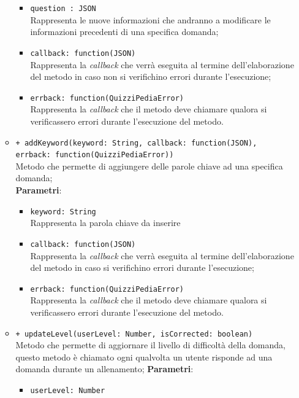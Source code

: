 \begin{itemize}
\begin{itemize}
		\begin{itemize}
			\item \texttt{question : JSON} \\
			Rappresenta le nuove informazioni che andranno a modificare le informazioni precedenti di una specifica domanda;
			\item \texttt{callback: function(JSON)} \\
			Rappresenta la \textit{callback} che verrà eseguita al termine dell'elaborazione del metodo in caso non si verifichino errori durante l'esecuzione;
			\item \texttt{errback: function(QuizziPediaError)} \\
			Rappresenta la \textit{callback} che il metodo deve chiamare qualora si verificassero errori durante l'esecuzione del metodo.
		\end{itemize}
	\item \texttt{+ addKeyword(keyword: String, callback: function(JSON),\\ errback: function(QuizziPediaError))} \\
	Metodo che permette di aggiungere delle parole chiave ad una specifica domanda; \\
		\textbf{Parametri}:
			 \begin{itemize}
			 	\item \texttt{keyword: String} \\
			 	Rappresenta la parola chiave da inserire
			 	\item \texttt{callback: function(JSON)} \\
			 	Rappresenta la \textit{callback} che verrà eseguita al termine dell'elaborazione del metodo in caso si verifichino errori durante l'esecuzione;
			 	\item \texttt{errback: function(QuizziPediaError)} \\
			 	Rappresenta la \textit{callback} che il metodo deve chiamare qualora si verificassero errori durante l'esecuzione del metodo.
			 \end{itemize}
	\item \texttt{+ updateLevel(userLevel: Number, isCorrected: boolean)} \\
	Metodo che permette di aggiornare il livello di difficoltà della domanda, questo metodo è chiamato ogni qualvolta un utente risponde ad una domanda durante un allenamento;
		\textbf{Parametri}:
			\begin{itemize}
				\item \texttt{userLevel: Number} \\

\end{itemize}
\end{itemize}
\end{itemize}

